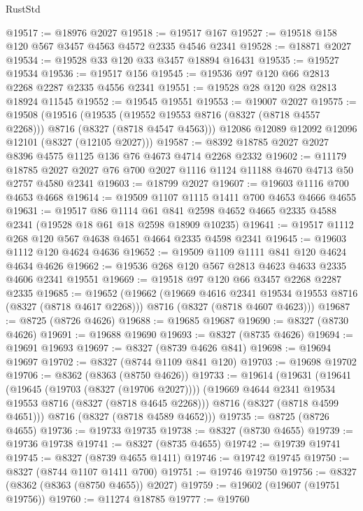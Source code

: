 \begin{lexlean}{RustStd}
\begin{coremodule}
@19517 := @18976 @2027
@19518 := @19517 @167
@19527 := @19518 @158 @120 @567 @3457 @4563 @4572 @2335 @4546 @2341
@19528 := @18871 @2027
@19534 := @19528 @33 @120 @33 @3457 @18894 @16431
@19535 := @19527 @19534
@19536 := @19517 @156
@19545 := @19536 @97 @120 @66 @2813 @2268 @2287 @2335 @4556 @2341
@19551 := @19528 @28 @120 @28 @2813 @18924 @11545
@19552 := @19545 @19551
@19553 := @19007 @2027
@19575 := @19508
    (@19516
      (@19535 (@19552 @19553 @8716 (@8327 (@8718 @4557 @2268))) @8716 (@8327 (@8718 @4547 @4563)))
      @12086
      @12089
      @12092
      @12096
      @12101
      (@8327 (@12105 @2027)))
@19587 := @8392 @18785 @2027 @2027 @8396 @4575 @1125 @136 @76 @4673 @4714 @2268 @2332
@19602 := @11179
    @18785
    @2027
    @2027
    @76
    @700
    @2027
    @1116
    @1124
    @11188
    @4670
    @4713
    @50
    @2757
    @4580
    @2341
@19603 := @18799 @2027
@19607 := @19603 @1116 @700 @4653 @4668
@19614 := @19509 @1107 @1115 @1411 @700 @4653 @4666 @4655
@19631 := @19517
    @86
    @1114
    @61
    @841
    @2598
    @4652
    @4665
    @2335
    @4588
    @2341
    (@19528 @18 @61 @18 @2598 @18909 @10235)
@19641 := @19517 @1112 @268 @120 @567 @4638 @4651 @4664 @2335 @4598 @2341
@19645 := @19603 @1112 @120 @4624 @4636
@19652 := @19509 @1109 @1111 @841 @120 @4624 @4634 @4626
@19662 := @19536 @268 @120 @567 @2813 @4623 @4633 @2335 @4606 @2341 @19551
@19669 := @19518 @97 @120 @66 @3457 @2268 @2287 @2335
@19685 := @19652
    (@19662
      (@19669 @4616 @2341 @19534 @19553 @8716 (@8327 (@8718 @4617 @2268)))
      @8716
      (@8327 (@8718 @4607 @4623)))
@19687 := @8725 (@8726 @4626)
@19688 := @19685 @19687
@19690 := @8327 (@8730 @4626)
@19691 := @19688 @19690
@19693 := @8327 (@8735 @4626)
@19694 := @19691 @19693
@19697 := @8327 (@8739 @4626 @841)
@19698 := @19694 @19697
@19702 := @8327 (@8744 @1109 @841 @120)
@19703 := @19698 @19702
@19706 := @8362 (@8363 (@8750 @4626))
@19733 := @19614
    (@19631
      (@19641
        (@19645 (@19703 (@8327 (@19706 @2027))))
        (@19669 @4644 @2341 @19534 @19553 @8716 (@8327 (@8718 @4645 @2268)))
        @8716
        (@8327 (@8718 @4599 @4651)))
      @8716
      (@8327 (@8718 @4589 @4652)))
@19735 := @8725 (@8726 @4655)
@19736 := @19733 @19735
@19738 := @8327 (@8730 @4655)
@19739 := @19736 @19738
@19741 := @8327 (@8735 @4655)
@19742 := @19739 @19741
@19745 := @8327 (@8739 @4655 @1411)
@19746 := @19742 @19745
@19750 := @8327 (@8744 @1107 @1411 @700)
@19751 := @19746 @19750
@19756 := @8327 (@8362 (@8363 (@8750 @4655)) @2027)
@19759 := @19602 (@19607 (@19751 @19756))
@19760 := @11274 @18785
@19777 := @19760

\end{coremodule}
\end{lexlean}
